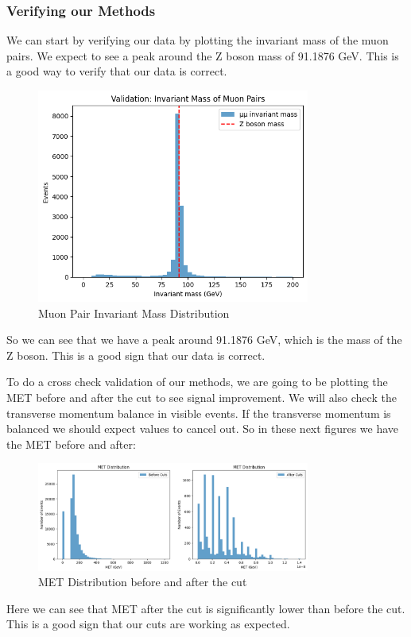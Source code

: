 \subsubsection{Verifying our Methods}
We can start by verifying our data by plotting the invariant mass of the muon pairs. We expect to see a peak around the Z boson mass of 91.1876 GeV. This is a good way to verify that our data is correct. 

\begin{figure}[H]
    \centering
    \includegraphics[width=0.8\textwidth]{AnalyzingColliderEvents/figures/muonmass.png}
    \caption{Muon Pair Invariant Mass Distribution}
    \label{fig:muon_pair}
\end{figure}

So we can see that we have a peak around 91.1876 GeV, which is the mass of the Z boson. This is a good sign that our data is correct.

To do a cross check validation of our methods, we are going to be plotting the MET before and after the cut to see signal improvement. We will also check the transverse momentum balance in visible events. If the transverse momentum is balanced we should expect values to cancel out. 
So in these next figures we have the MET before and after:

\begin{figure}[H]
    \centering
    \includegraphics[width=0.8\textwidth]{AnalyzingColliderEvents/figures/MET.png}
    \caption{MET Distribution before and after the cut}
    \label{fig:MET_before}
\end{figure}
Here we can see that MET after the cut is significantly lower than before the cut. This is a good sign that our cuts are working as expected.

